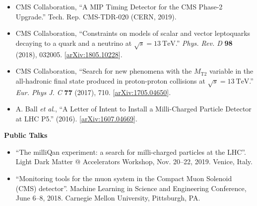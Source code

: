 \begin{vitae}
\begin{flushleft}
\begin{itemize}
\item CMS Collaboration, ``A MIP Timing Detector for the CMS Phase-2 Upgrade.''
Tech. Rep. CMS-TDR-020 (CERN, 2019).

\item CMS Collaboration, ``Constraints on models of scalar and vector leptoquarks decaying to a quark
  and a neutrino at $\sqrt{s}=13~\mathrm{TeV}$.'' \textit{Phys. Rev. D}
  \textbf{98} (2018), 032005. 
  [\href{https://arxiv.org/abs/1805.10228}{arXiv:1805.10228}].

\item CMS Collaboration, ``Search for new phenomena with the $M_\mathrm{T2}$ variable in the all-hadronic
  final state produced in proton-proton collisions at $\sqrt{s}=13~\mathrm{TeV}$.'' \textit{Eur. Phys J. C}
  \textbf{77} (2017), 710.
  [\href{https://arxiv.org/abs/1705.04650}{arXiv:1705.04650}].

\item A. Ball \textit{et al}., ``A Letter of Intent to Install a Milli-Charged Particle Detector at LHC P5.'' (2016).
  [\href{https://arxiv.org/abs/1607.04669}{arXiv:1607.04669}].

\end{itemize}


\vspace{4mm}
\textbf{Public Talks}
\vspace{-1mm}

\begin{itemize}\setlength\itemsep{2mm}

\item ``The milliQan experiment: a search for milli-charged particles at the LHC''.
Light Dark Matter @ Accelerators Workshop, Nov. 20--22, 2019. Venice, Italy.

\item ``Monitoring tools for the muon system in the Compact Muon Solenoid (CMS) detector''.
Machine Learning in Science and Engineering Conference, June 6--8, 2018. Carnegie Mellon
University, Pittsburgh, PA.

\end{itemize}

\end{flushleft}

\end{vitae}
